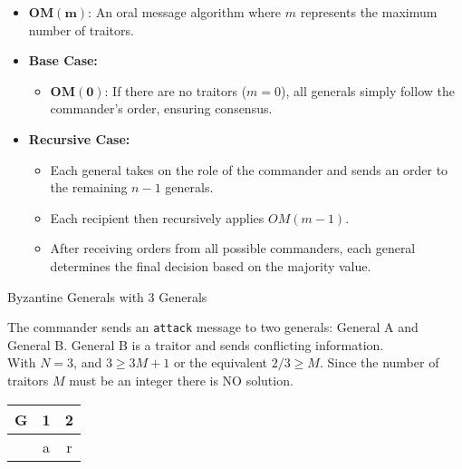 \begin{itemize}[itemsep=1pt, topsep=2pt]
    \item $\mathbf{OM(m)}$: An oral message algorithm where $ m $ represents the maximum number of traitors.
    \item \textbf{Base Case:} 
    \begin{itemize}[noitemsep, topsep=1pt]
        \item $\mathbf{OM(0)}$: If there are no traitors ($m = 0$), all generals simply follow the commander's order, ensuring consensus.
    \end{itemize}
    \item \textbf{Recursive Case:} 
    \begin{itemize}[noitemsep, topsep=1pt]
        \item Each general takes on the role of the commander and sends an order to the remaining $ n - 1 $ generals.
        \item Each recipient then recursively applies $OM(m-1)$.
        \item After receiving orders from all possible commanders, each general determines the final decision based on the majority value.
    \end{itemize}
\end{itemize}

\begin{example}{Byzantine Generals with 3 Generals}
\begin{minipage}{0.75\textwidth} %
The commander sends an \texttt{attack} message to two generals: General A and General B. General B is a traitor and sends conflicting information. \\ 

With $N=3$, and $3 \geq 3M+1$ or the equivalent $2/3 \geq M$. Since the number of traitors $M$ must be an integer there is NO solution.
\end{minipage}
\hfill
\begin{minipage}{0.2\textwidth} %
\begin{center}
\begin{tabular}{|c|c|c|}
    \hline
    G & 1 & 2 \\ \hline
    ~ & a & r \\ \hline
\end{tabular}
\end{center}
\end{minipage}
\end{example}

